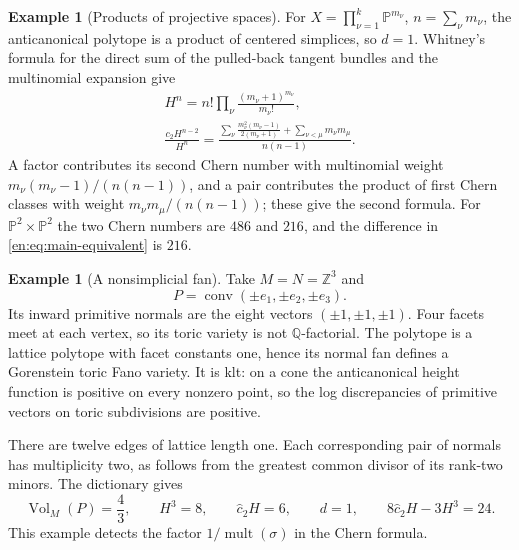 \documentclass[12pt]{amsart}
\theoremstyle{definition}
\newtheorem{eg}[thm]{Example}
\theoremstyle{remark}
\numberwithin{equation}{section}
\theoremstyle{plain}
\theoremstyle{definition}
\theoremstyle{remark}
\begin{document}
\begin{eg}[Products of projective spaces]\label{en:ex:products}
For $X=\prod_{\nu=1}^k\mathbb P^{m_\nu}$, $n=\sum_\nu m_\nu$, the anticanonical polytope is a product of centered simplices, so $d=1$.
Whitney's formula for the direct sum of the pulled-back tangent bundles and the multinomial expansion give
\begin{equation}\label{en:eq:product}
 \begin{gathered}
 H^n=n!\prod_\nu\frac{(m_\nu+1)^{m_\nu}}{m_\nu!},\\
 \frac{c_2H^{n-2}}{H^n}
 =\frac{\displaystyle
   \sum_\nu\frac{m_\nu^2(m_\nu-1)}{2(m_\nu+1)}
   +\sum_{\nu<\mu}m_\nu m_\mu}{n(n-1)}.
 \end{gathered}
\end{equation}
A factor contributes its second Chern number with multinomial weight
$m_\nu(m_\nu-1)/(n(n-1))$, and a pair contributes the product of first Chern classes with weight $m_\nu m_\mu/(n(n-1))$; these give the second formula.
For $\mathbb P^2\times\mathbb P^2$ the two Chern numbers are $486$ and $216$, and the difference in \eqref{en:eq:main-equivalent} is $216$.
\end{eg}

\begin{eg}[A nonsimplicial fan]\label{en:ex:nonsimplicial}
Take $M=N=\mathbb Z^3$ and
\[P=\operatorname{conv}(\pm e_1,\pm e_2,\pm e_3).\]
Its inward primitive normals are the eight vectors $(\pm1,\pm1,\pm1)$.
Four facets meet at each vertex, so its toric variety is not $\mathbb Q$-factorial. The polytope is a lattice polytope with facet constants one, hence its normal fan defines a Gorenstein toric Fano variety. It is klt: on a cone the anticanonical height function is positive on every nonzero point, so the log discrepancies of primitive vectors on toric subdivisions are positive.

There are twelve edges of lattice length one. Each corresponding pair of normals has multiplicity two, as follows from the greatest common divisor of its rank-two minors. The dictionary gives
\begin{equation}\label{en:eq:octahedron}
 \operatorname{Vol}_M(P)=\frac43,\qquad
 H^3=8,\qquad \widehat c_2H=6,\qquad d=1,\qquad
 8\widehat c_2H-3H^3=24.
\end{equation}
This example detects the factor $1/\operatorname{mult}(\sigma)$ in the Chern formula.
\end{eg}
\end{document}
